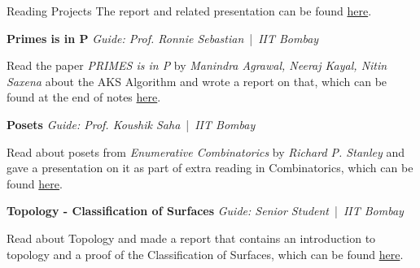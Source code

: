 \begin{rubric}{Reading Projects}
	The report and related presentation can be found \href{https://aryamanmaithani.github.io/math/alg-top/}{here}.

\entry*[2020] \textbf{Primes is in P} \hfill \emph{Guide: Prof. Ronnie Sebastian} \,|\, \emph{IIT Bombay}

	Read the paper \emph{PRIMES is in P} by \emph{Manindra Agrawal, Neeraj Kayal, Nitin Saxena} about the AKS Algorithm and wrote a report on that, which can be found at the end of notes \href{http://www.math.iitb.ac.in/~ronnie/Spring2020/Lecture-Notes-Galois-Theory.pdf}{here}.


\entry*[2019] \textbf{Posets} \hfill \emph{Guide: Prof. Koushik Saha} \,|\, \emph{IIT Bombay}

	Read about posets from \emph{Enumerative Combinatorics} by \emph{Richard P. Stanley} and gave a presentation on it as part of extra reading in Combinatorics, which can be found \href{https://aryamanmaithani.github.io/math/posets/}{here}.

\entry*[2019] \textbf{Topology - Classification of Surfaces} \hfill \emph{Guide: Senior Student} \,|\, \emph{IIT Bombay}

	Read about Topology and made a report that contains an introduction to topology and a proof of the Classification of Surfaces, which can be found \href{https://aryamanmaithani.github.io/math/classification-of-surfaces/Classification%20of%20Surfaces.pdf}{here}.
\end{rubric}